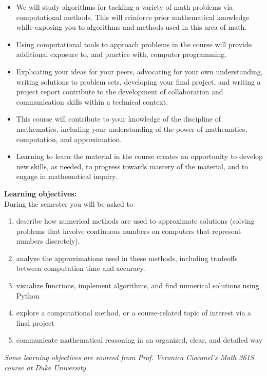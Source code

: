 \documentclass[12pt,letterpaper]{exam}
\begin{document}
\begin{itemize}
\setlength\itemsep{0.1em}
    \item We will study algorithms for tackling a variety of math problems via computational methods.  This will reinforce prior mathematical knowledge while exposing you to algorithms and methods used in this area of math.
    \item Using computational tools to approach problems in the course will provide additional exposure to, and practice with, computer programming.
    \item Explicating your ideas for your peers, advocating for your own understanding, writing solutions to problem sets, developing your final project, and writing a project report contribute to the development of collaboration and communication skills within a technical context.
    \item This course will contribute to your knowledge of the discipline of mathematics, including your understanding of the power of mathematics, computation, and approximation.
    \item Learning to learn the material in the course creates an opportunity to develop new skills, as needed, to progress towards mastery of the material, and to engage in mathematical inquiry.
\end{itemize}
\textbf{Learning objectives:} \\
During the semester you will be asked to
\begin{enumerate}
\setlength\itemsep{0.1em}
\item describe how numerical methods are used to approximate solutions (solving problems that involve continuous numbers on computers that represent numbers discretely).
\item analyze the approximations used in these methods, including tradeoffs between computation time and accuracy.
\item visualize functions, implement algorithms, and find numerical solutions using Python
\item explore a computational method, or a course-related topic of interest via a final project
\item communicate mathematical reasoning in an organized, clear, and detailed way
\end{enumerate}

\noindent \emph{Some learning objectives are sourced from Prof. Veronica Ciocanel's Math 361S course at Duke University.}
\end{document}
